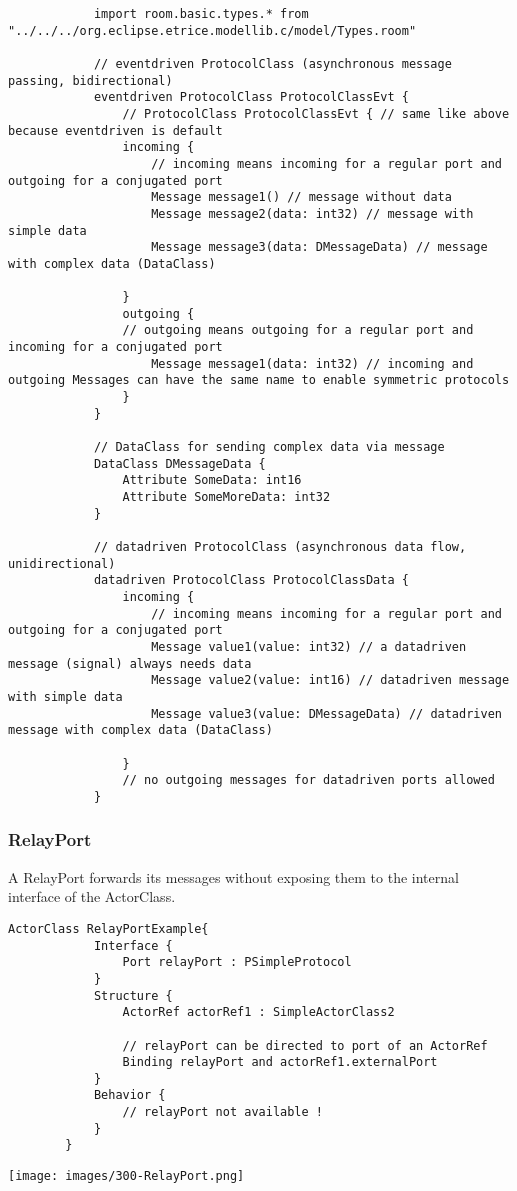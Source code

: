 			\begin{lstlisting}
			import room.basic.types.* from "../../../org.eclipse.etrice.modellib.c/model/Types.room"
			
			// eventdriven ProtocolClass (asynchronous message passing, bidirectional)
			eventdriven ProtocolClass ProtocolClassEvt {
				// ProtocolClass ProtocolClassEvt { // same like above because eventdriven is default 
				incoming {
					// incoming means incoming for a regular port and outgoing for a conjugated port
					Message message1() // message without data
					Message message2(data: int32) // message with simple data
					Message message3(data: DMessageData) // message with complex data (DataClass)
			
				}
				outgoing {
				// outgoing means outgoing for a regular port and incoming for a conjugated port
					Message message1(data: int32) // incoming and outgoing Messages can have the same name to enable symmetric protocols
				}
			}
			
			// DataClass for sending complex data via message
			DataClass DMessageData {
				Attribute SomeData: int16
				Attribute SomeMoreData: int32
			}
			
			// datadriven ProtocolClass (asynchronous data flow, unidirectional)
			datadriven ProtocolClass ProtocolClassData {
				incoming {
					// incoming means incoming for a regular port and outgoing for a conjugated port
					Message value1(value: int32) // a datadriven message (signal) always needs data
					Message value2(value: int16) // datadriven message with simple data
					Message value3(value: DMessageData) // datadriven message with complex data (DataClass)
			
				}
				// no outgoing messages for datadriven ports allowed 
			}
			\end{lstlisting}
	
	\vspace{\baselineskip}
	\vspace{\baselineskip}
	\vspace{\baselineskip}
	
	\subsubsection{RelayPort}
		\hypertarget{ref:RelayPort}{}
		
		A RelayPort forwards its messages without exposing them to the internal interface of the ActorClass.
		
		\begin{lstlisting}[language=ROOM]
		ActorClass RelayPortExample{
			Interface {
				Port relayPort : PSimpleProtocol
			}
			Structure {
				ActorRef actorRef1 : SimpleActorClass2
				
				// relayPort can be directed to port of an ActorRef
				Binding relayPort and actorRef1.externalPort
			}
			Behavior {
				// relayPort not available !
			}
		}
		\end{lstlisting}
		\texttt{[image: images/300-RelayPort.png]}
		
